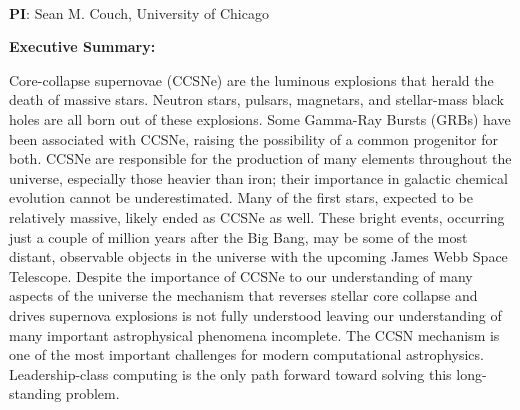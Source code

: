 \documentclass[12pt,letterpaper]{article}
\begin{document}
\setlength{\parindent}{0in}

\pagestyle{fancy}
\renewcommand{\headrulewidth}{0.0pt}

\begin{center} \textbf{\doctitle{}} \\
\end{center}

\begin{flushleft}
\textbf{PI}:
Sean M. Couch, University of Chicago \\
\medskip

\textbf{Executive Summary:}

{\parindent 16pt

  Core-collapse supernovae (CCSNe) are the luminous explosions that
  herald the death of massive stars.  Neutron stars, pulsars,
  magnetars, and stellar-mass black holes are all born out of these
  explosions.  Some Gamma-Ray Bursts (GRBs) have been associated with
  CCSNe, raising the possibility of a common progenitor for both.
  CCSNe are responsible for the production of many elements throughout
  the universe, especially those heavier than iron; their importance
  in galactic chemical evolution cannot be underestimated.  Many of
  the first stars, expected to be relatively massive, likely ended as
  CCSNe as well.  These bright events, occurring just a couple of
  million years after the Big Bang, may be some of the most distant,
  observable objects in the universe with the upcoming James Webb
  Space Telescope.  Despite the importance of CCSNe to our
  understanding of many aspects of the universe the mechanism that
  reverses stellar core collapse and drives supernova explosions is
  not fully understood leaving our understanding of many important
  astrophysical phenomena incomplete.  The CCSN mechanism is one of
  the most important challenges for modern computational astrophysics.
  Leadership-class computing is the only path forward toward solving
  this long-standing problem.

}
\end{flushleft}
\end{document}
